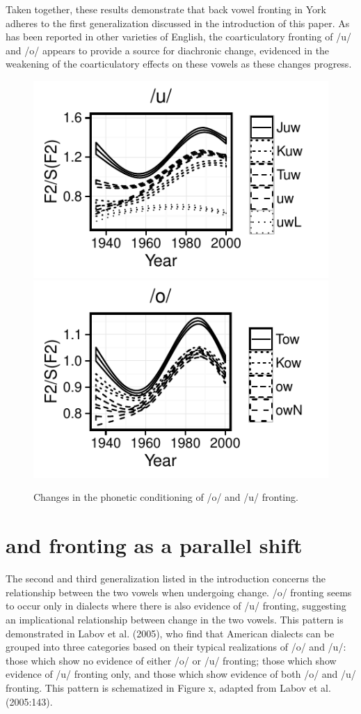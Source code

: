 \documentclass[12pt]{article}
\begin{document}
Taken together, these results demonstrate that back vowel fronting in York adheres to the first generalization discussed in the introduction of this paper. As has been reported in other varieties of English, the coarticulatory fronting of /u/ and /o/ appears to provide a source for diachronic change, evidenced in the weakening of the coarticulatory effects on these vowels as these changes progress.  
\begin{figure}[!htbp]
\includegraphics{uwphoneticconditioning}
\includegraphics{owphoneticconditioning}
\caption{Changes in the phonetic conditioning of /o/ and /u/ fronting.}
\end{figure}

\section{ and  fronting as a parallel shift}

The second and third generalization listed in the introduction concerns the relationship between the two vowels when undergoing change. /o/ fronting seems to occur only in dialects where there is also evidence of /u/ fronting, suggesting an implicational relationship between change in the two vowels. This pattern is demonstrated in Labov et al. (2005), who find that American dialects can be grouped into three categories based on their typical realizations of /o/ and /u/: those which show no evidence of either /o/ or /u/ fronting; those which show evidence of /u/ fronting only, and those which show evidence of both /o/ and /u/ fronting. This pattern is schematized in Figure x, adapted from Labov et al. (2005:143).
  
\end{document}
